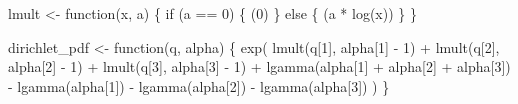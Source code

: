 \documentclass[
  letterpaper,
  DIV=11,
  numbers=noendperiod]{scrartcl}
\newenvironment{Shaded}{\begin{snugshade}}{\end{snugshade}}
\newcommand{\ControlFlowTok}[1]{\textcolor[rgb]{0.00,0.23,0.31}{#1}}
\newcommand{\DecValTok}[1]{\textcolor[rgb]{0.68,0.00,0.00}{#1}}
\newcommand{\FunctionTok}[1]{\textcolor[rgb]{0.28,0.35,0.67}{#1}}
\newcommand{\NormalTok}[1]{\textcolor[rgb]{0.00,0.23,0.31}{#1}}
\newcommand{\OtherTok}[1]{\textcolor[rgb]{0.00,0.23,0.31}{#1}}
\newcommand{\SpecialCharTok}[1]{\textcolor[rgb]{0.37,0.37,0.37}{#1}}
\begin{document}
\begin{Shaded}
\begin{Highlighting}[]
\NormalTok{lmult }\OtherTok{\textless{}{-}} \ControlFlowTok{function}\NormalTok{(x, a) \{}
  \ControlFlowTok{if}\NormalTok{ (a }\SpecialCharTok{==} \DecValTok{0}\NormalTok{) \{}
\NormalTok{    (}\DecValTok{0}\NormalTok{)}
\NormalTok{  \} }\ControlFlowTok{else}\NormalTok{ \{}
\NormalTok{    (a }\SpecialCharTok{*} \FunctionTok{log}\NormalTok{(x))}
\NormalTok{  \}}
\NormalTok{\}}

\NormalTok{dirichlet\_pdf }\OtherTok{\textless{}{-}} \ControlFlowTok{function}\NormalTok{(q, alpha) \{}
  \FunctionTok{exp}\NormalTok{(  }\FunctionTok{lmult}\NormalTok{(q[}\DecValTok{1}\NormalTok{], alpha[}\DecValTok{1}\NormalTok{] }\SpecialCharTok{{-}} \DecValTok{1}\NormalTok{)}
        \SpecialCharTok{+} \FunctionTok{lmult}\NormalTok{(q[}\DecValTok{2}\NormalTok{], alpha[}\DecValTok{2}\NormalTok{] }\SpecialCharTok{{-}} \DecValTok{1}\NormalTok{)}
        \SpecialCharTok{+} \FunctionTok{lmult}\NormalTok{(q[}\DecValTok{3}\NormalTok{], alpha[}\DecValTok{3}\NormalTok{] }\SpecialCharTok{{-}} \DecValTok{1}\NormalTok{)}
        \SpecialCharTok{+} \FunctionTok{lgamma}\NormalTok{(alpha[}\DecValTok{1}\NormalTok{] }\SpecialCharTok{+}\NormalTok{ alpha[}\DecValTok{2}\NormalTok{] }\SpecialCharTok{+}\NormalTok{ alpha[}\DecValTok{3}\NormalTok{])}
        \SpecialCharTok{{-}} \FunctionTok{lgamma}\NormalTok{(alpha[}\DecValTok{1}\NormalTok{]) }\SpecialCharTok{{-}} \FunctionTok{lgamma}\NormalTok{(alpha[}\DecValTok{2}\NormalTok{]) }\SpecialCharTok{{-}} \FunctionTok{lgamma}\NormalTok{(alpha[}\DecValTok{3}\NormalTok{]) )}
\NormalTok{\}}
\end{Highlighting}
\end{Shaded}
\end{document}
